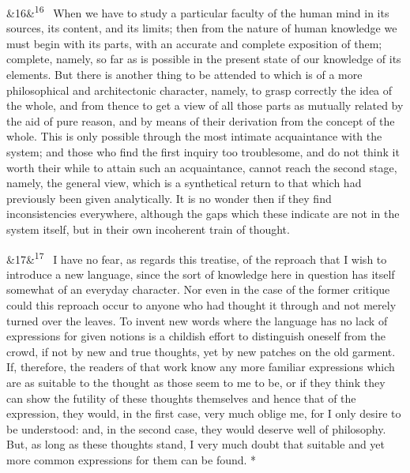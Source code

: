 \documentclass[12pt]{article}
\newcommand{\para}[1][]{\par\noindent\ifx&#1&\else\textsuperscript{\footnotesize #1}~\fi}
\begin{document}
\para[16] When we have to study a particular faculty of the human mind in its sources, its content, and its limits; then from the nature of human knowledge we must begin with its parts, with an accurate and complete exposition of them; complete, namely, so far as is possible in the present state of our knowledge of its elements. But there is another thing to be attended to which is of a more philosophical and architectonic character, namely, to grasp correctly the idea of the whole, and from thence to get a view of all those parts as mutually related by the aid of pure reason, and by means of their derivation from the concept of the whole. This is only possible through the most intimate acquaintance with the system; and those who find the first inquiry too troublesome, and do not think it worth their while to attain such an acquaintance, cannot reach the second stage, namely, the general view, which is a synthetical return to that which had previously been given analytically. It is no wonder then if they find inconsistencies everywhere, although the gaps which these indicate are not in the system itself, but in their own incoherent train of thought.

\para[17] I have no fear, as regards this treatise, of the reproach that I wish to introduce a new language, since the sort of knowledge here in question has itself somewhat of an everyday character. Nor even in the case of the former critique could this reproach occur to anyone who had thought it through and not merely turned over the leaves. To invent new words where the language has no lack of expressions for given notions is a childish effort to distinguish oneself from the crowd, if not by new and true thoughts, yet by new patches on the old garment. If, therefore, the readers of that work know any more familiar expressions which are as suitable to the thought as those seem to me to be, or if they think they can show the futility of these thoughts themselves and hence that of the expression, they would, in the first case, very much oblige me, for I only desire to be understood: and, in the second case, they would deserve well of philosophy. But, as long as these thoughts stand, I very much doubt that suitable and yet more common expressions for them can be found. *
\end{document}
